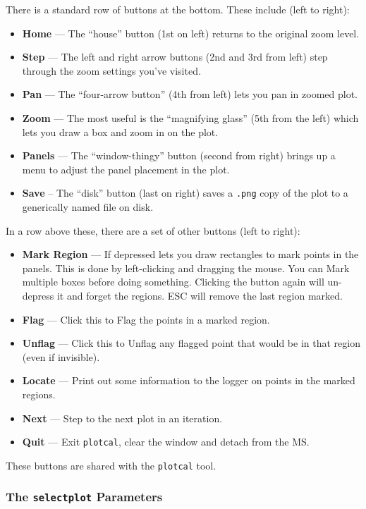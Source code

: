 There is a standard row of buttons at the bottom.  These include
(left to right):
\begin{itemize}
\item {\bf Home} --- The ``house'' button (1st on left) returns to
  the original zoom level.
\item {\bf Step} --- The left and right arrow buttons (2nd and 3rd
  from left) step through the zoom settings you've visited.
\item {\bf Pan} --- The ``four-arrow button'' (4th from left) lets you pan
  in zoomed plot.
\item {\bf Zoom} --- The most useful is the ``magnifying glass'' (5th
  from the left) which lets you draw a box and zoom in on the plot.  
\item {\bf Panels} --- The ``window-thingy'' button (second from
  right) brings up a menu to adjust the panel placement in the plot.
\item {\bf Save} -- The ``disk'' button (last on right) saves a
  {\tt .png} copy of the plot to a generically named file on disk.
\end{itemize}

In a row above these, there are a set of other buttons (left to right):
\begin{itemize}
\item {\bf Mark Region} --- If depressed lets you draw rectangles to
  mark points in the panels.  This is done by left-clicking and
  dragging the mouse.  You can Mark multiple boxes before doing
  something.  Clicking the button again will un-depress it and forget
  the regions.  ESC will remove the last region marked.
\item {\bf Flag} --- Click this to Flag the points in a marked region.
\item {\bf Unflag} --- Click this to Unflag any flagged point that
  would be in that region (even if invisible).
\item {\bf Locate} --- Print out some information to the logger on
  points in the marked regions.  
\item {\bf Next} --- Step to the next plot in an iteration.
\item {\bf Quit} --- Exit {\tt plotcal}, clear the window and detach from the MS.
\end{itemize}

These buttons are shared with the {\tt plotcal} tool.

\subsubsection{The {\tt selectplot} Parameters}
\label{section:edit.plot.plotxy.select}

